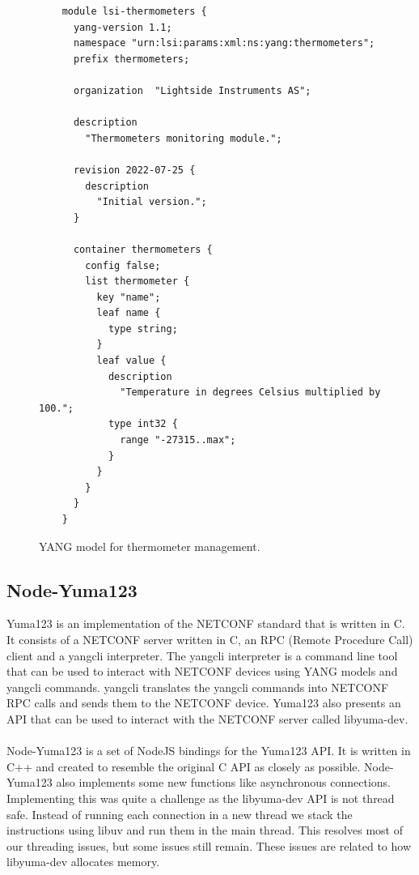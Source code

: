 \documentclass[12pt]{article}
\begin{document}
\begin{figure}
  \begin{verbatim}
    module lsi-thermometers {
      yang-version 1.1;
      namespace "urn:lsi:params:xml:ns:yang:thermometers";
      prefix thermometers;

      organization  "Lightside Instruments AS";

      description
        "Thermometers monitoring module.";

      revision 2022-07-25 {
        description
          "Initial version.";
      }

      container thermometers {
        config false;
        list thermometer {
          key "name";
          leaf name {
            type string;
          }
          leaf value {
            description
              "Temperature in degrees Celsius multiplied by 100.";
            type int32 {
              range "-27315..max";
            }
          }
        }
      }
    }
  \end{verbatim}
  \caption{YANG model for thermometer management.}
  \label{fig:yang}
\end{figure}

\newpage

\subsection{Node-Yuma123}
Yuma123 is an implementation of the NETCONF standard that is written in C.
It consists of a NETCONF server written in C, an RPC (Remote Procedure Call) client 
and a yangcli interpreter. The yangcli interpreter is a command line tool that can be used to
interact with NETCONF devices using YANG models and yangcli commands. yangcli
translates the yangcli commands into NETCONF RPC calls and sends them to the NETCONF device.
Yuma123 also presents an API that can be used to interact with the NETCONF server called 
libyuma-dev.
\\
\\
Node-Yuma123 is a set of NodeJS bindings for the Yuma123 API. It is written in C++ and created
to resemble the original C API as closely as possible. Node-Yuma123 also implements some 
new functions like asynchronous connections. Implementing this was quite a challenge as the 
libyuma-dev API is not thread safe. Instead of running each connection in a new thread we
stack the instructions using libuv \cite{LibuvDocumentation} and run them in the main thread. This 
resolves most of our threading issues, but some issues still remain. 
These issues are related to how libyuma-dev allocates memory.
\end{document}
